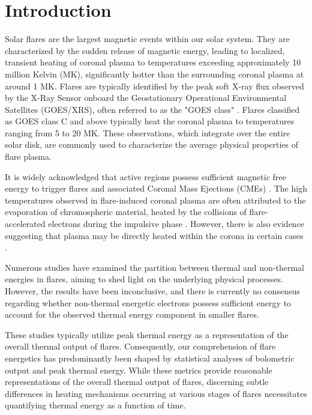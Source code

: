 
\section{Introduction} \label{sec:intro}

Solar flares are the largest magnetic events within our solar system. They are characterized by the sudden release of magnetic energy, leading to localized, transient heating of coronal plasma to temperatures exceeding approximately 10 million Kelvin (MK), significantly hotter than the surrounding coronal plasma at around 1 MK. Flares are typically identified by the peak soft X-ray flux observed by the X-Ray Sensor onboard the Geostationary Operational Environmental Satellites (GOES/XRS), often referred to as the "GOES class" \citep{xrs}. Flares classified as GOES class C and above typically heat the coronal plasma to temperatures ranging from 5 to 20 MK. These observations, which integrate over the entire solar disk, are commonly used to characterize the average physical properties of flare plasma.

It is widely acknowledged that active regions possess sufficient magnetic free energy to trigger flares and associated Coronal Mass Ejections (CMEs) \citep{emslie12, ash17}. The high temperatures observed in flare-induced coronal plasma are often attributed to the evaporation of chromospheric material, heated by the collisions of flare-accelerated electrons during the impulsive phase \citep{fletcher11}. However, there is also evidence suggesting that plasma may be directly heated within the corona in certain cases \citep[e.g.,][]{longcope11, reeves17}.

Numerous studies \citep{stosire07, emslie12, inglis14, warmuth16a, warmuth16b, ash17} have examined the partition between thermal and non-thermal energies in flares, aiming to shed light on the underlying physical processes. However, the results have been inconclusive, and there is currently no consensus regarding whether non-thermal energetic electrons possess sufficient energy to account for the observed thermal energy component in smaller flares.

These studies typically utilize peak thermal energy as a representation of the overall thermal output of flares. Consequently, our comprehension of flare energetics has predominantly been shaped by statistical analyses of bolometric output and peak thermal energy. While these metrics provide reasonable representations of the overall thermal output of flares, discerning subtle differences in heating mechanisms occurring at various stages of flares necessitates quantifying thermal energy as a function of time.

